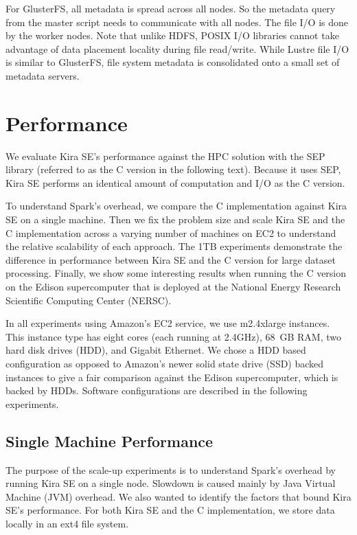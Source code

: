 \documentclass[conference]{IEEEtran}
\begin{document}
For GlusterFS, all metadata is spread across all nodes. So the metadata query from the master script
needs to communicate with all nodes. The file I/O is done by the worker nodes. Note that unlike HDFS, 
POSIX I/O libraries cannot take advantage of data placement locality during file read/write. While Lustre 
file I/O is similar to GlusterFS, file system metadata is consolidated onto a small set of metadata servers.




\section{Performance}
\label{sec:Performance}

We evaluate Kira SE's performance against the HPC solution with the SEP library
(referred to as the C version in the following text). Because it uses SEP, Kira SE performs an identical amount of
computation and I/O as the C version.

To understand Spark's overhead, we compare the C implementation against Kira SE on a single
machine. Then we fix the problem size and scale Kira SE and the C implementation across a
varying number of machines on EC2 to understand the relative scalability of each approach.
The 1TB experiments demonstrate the difference in performance between Kira SE and the C version
for large dataset processing. Finally, we show some interesting results when running the C
version on the Edison supercomputer that is deployed at the National Energy Research Scientific Computing Center (NERSC).

In all experiments using Amazon's EC2 service, we use m2.4xlarge instances.
This instance type has eight cores (each running at 2.4GHz), 68~GB RAM, two hard disk drives (HDD), and Gigabit Ethernet. 
We chose a HDD based configuration as opposed to Amazon's newer solid state drive (SSD) backed instances to give a fair comparison
against the Edison supercomputer, which is backed by HDDs. 
Software configurations are described in the following experiments.

\subsection{Single Machine Performance}
\label{sec:Performance-scaleup}

The purpose of the scale-up experiments is to understand Spark's overhead by running
Kira SE on a single node. Slowdown is caused mainly by Java Virtual Machine (JVM) overhead. 
We also wanted to identify the factors
that bound Kira SE's performance. For both Kira SE and the C implementation, we store data
locally in an ext4 file system.
\end{document}
